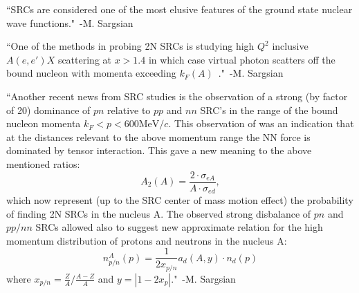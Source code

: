 ``SRCs are considered one of the most elusive features of the ground state nuclear wave functions."~-M. Sargsian~\cite{Sargsian:2012gj}

``One of the methods in probing 2N SRCs is studying high $Q^2$ inclusive $A(e,e')X$ scattering at $x>1.4$ in which case virtual photon scatters off the bound nucleon with momenta exceeding $k_F(A)$~\cite{Sargsian:2001ax, Sargsian:2002wc}."~-M. Sargsian~\cite{Sargsian:2012gj}

``Another recent news from SRC studies is the observation of a strong (by factor of 20) dominance of $pn$ relative to $pp$ and $nn$ SRC's in the range of the bound nucleon momenta $k_F<p<600 \mathrm{MeV}/c$\cite{Piasetzky:2006ai,Subedi:2008zz}. This observation of was an indication that at the distances relevant to the above momentum range the NN force is dominated by tensor interaction. This gave a new meaning to the above mentioned ratios:
\begin{equation}
	A_2(A) = \frac{2\cdot \sigma_{eA}}{A\cdot \sigma_{ed}},
\end{equation}
which now represent (up to the SRC center of mass motion effect) the probability of finding 2N SRCs in the nucleus A. The observed strong disbalance of $pn$ and $pp/nn$ SRCs allowed also to suggest new approximate relation for the high momentum distribution of protons and neutrons in the nucleus A\cite{McGauley:2011qc}:
\begin{equation}
	n^A_{p/n}(p) = \frac{1}{2x_{p/n}}a_d(A,y)\cdot n_d(p)
\end{equation}
where $x_{p/n}=\frac{Z}{A}/\frac{A-Z}{A}$ and $y=\left| 1-2x_p\right|$."~-M. Sargsian~\cite{Sargsian:2012gj}
